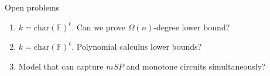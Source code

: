 \begin{frame}{Open problems}

    \begin{enumerate}
        \item $k = \mathrm{char}(\mathbb{F})^{\ell}$. Can we prove $\Omega(n)$-degree lower bound?
        \item $k = \mathrm{char}(\mathbb{F})^{\ell}$. Polynomial calculus lower bounds?
        \item Model that can capture $mSP$ and monotone circuits simultaneously?
    \end{enumerate}
\end{frame}